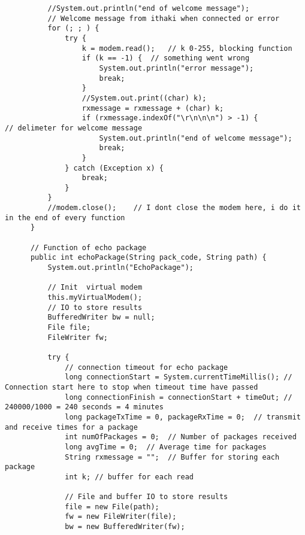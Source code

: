 \documentclass[10pt,a4paper]{article}
\begin{document}
\begin{lstlisting}
          //System.out.println("end of welcome message");
          // Welcome message from ithaki when connected or error
          for (; ; ) {
              try {
                  k = modem.read();   // k 0-255, blocking function
                  if (k == -1) {  // something went wrong
                      System.out.println("error message");
                      break;
                  }
                  //System.out.print((char) k);
                  rxmessage = rxmessage + (char) k;
                  if (rxmessage.indexOf("\r\n\n\n") > -1) {          // delimeter for welcome message
                      System.out.println("end of welcome message");
                      break;
                  }
              } catch (Exception x) {
                  break;
              }
          }
          //modem.close();    // I dont close the modem here, i do it in the end of every function
      }
  
      // Function of echo package
      public int echoPackage(String pack_code, String path) {
          System.out.println("EchoPackage");
  
          // Init  virtual modem
          this.myVirtualModem();
          // IO to store results
          BufferedWriter bw = null;
          File file;
          FileWriter fw;
  
          try {
              // connection timeout for echo package
              long connectionStart = System.currentTimeMillis(); // Connection start here to stop when timeout time have passed
              long connectionFinish = connectionStart + timeOut; // 240000/1000 = 240 seconds = 4 minutes
              long packageTxTime = 0, packageRxTime = 0;  // transmit and receive times for a package
              int numOfPackages = 0;  // Number of packages received
              long avgTime = 0;  // Average time for packages
              String rxmessage = "";  // Buffer for storing each package
              int k; // buffer for each read
  
              // File and buffer IO to store results
              file = new File(path);
              fw = new FileWriter(file);
              bw = new BufferedWriter(fw);
  

\end{lstlisting}
\end{document}
